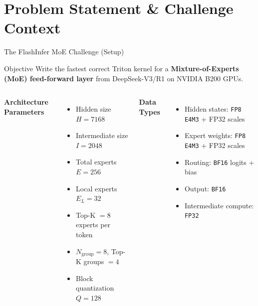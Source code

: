 \documentclass[aspectratio=169,11pt]{beamer}
\begin{document}
\section{Problem Statement \& Challenge Context}

\begin{frame}[t]{The FlashInfer MoE Challenge (Setup)}
\small
\begin{block}{Objective}
Write the fastest correct Triton kernel for a \textbf{Mixture-of-Experts (MoE)
feed-forward layer} from DeepSeek-V3/R1 on NVIDIA B200 GPUs.
\end{block}

\begin{columns}[T]
\textbf{Architecture Parameters}
\begin{itemize}
    \item Hidden size $H = 7168$
    \item Intermediate size $I = 2048$
    \item Total experts $E = 256$
    \item Local experts $E_L = 32$
    \item Top-K $= 8$ experts per token
    \item $N_{\text{group}} = 8$, Top-K groups $= 4$
    \item Block quantization $Q = 128$
\end{itemize}

\textbf{Data Types}
\begin{itemize}
    \item Hidden states: \texttt{FP8 E4M3} + FP32 scales
    \item Expert weights: \texttt{FP8 E4M3} + FP32 scales
    \item Routing: \texttt{BF16} logits + bias
    \item Output: \texttt{BF16}
    \item Intermediate compute: \texttt{FP32}
\end{itemize}
\end{columns}
\end{frame}
\end{document}
